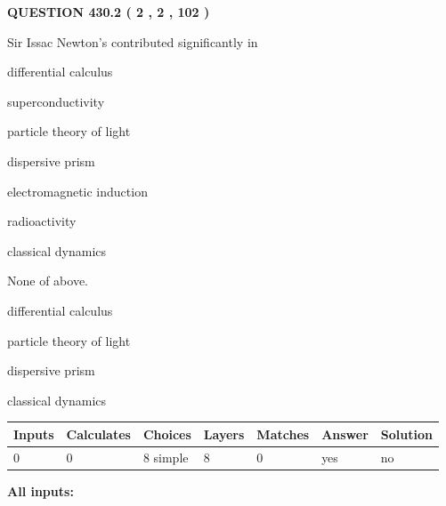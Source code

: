 \documentclass[12pt]{article}
\begin{document}
\vspace{0.2in}
  
{\textbf{\Large{QUESTION
430.2 
 ( 2 , 2 , 102 )
}}}
  
  
Sir Issac Newton's contributed significantly in
 
 
differential calculus
 
 
superconductivity
 
 
particle theory of light
 
 
dispersive prism
 
 
electromagnetic induction
 
 
radioactivity
 
 
classical dynamics
 
 
 None of above.
 
 
\noindent{}
 
 
differential calculus
 
 
particle theory of light
 
 
dispersive prism
 
 
classical dynamics
 
 
\noindent{}
 
 
   
   
   
   
\noindent\begin{tabular}{|l|l|l|l|l|l|l|}
 \hline
Inputs & Calculates & Choices & Layers & Matches & Answer & Solution \\ \hline
 0  & 
 0  & 
 8
  simple  
  & 
 8  & 
 0  & 
  yes & 
  no 
  \\ \hline
 \end{tabular}
   
   
   
   
\noindent{}
   
   
   
   
\noindent\vspace{0.1in}\hspace{-0.08in} {\textbf{\Large{All inputs: }}}
   
\end{document}
